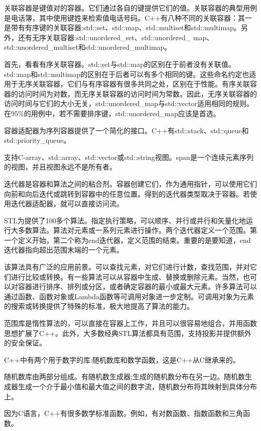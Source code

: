 关联容器是键值对的容器。它们通过各自的键提供它们的值。关联容器的典型用例是电话簿，其中使用键姓来检索值电话号码。C++有八种不同的关联容器：其一是带有有序键的关联容器:std::set、std::map、std::multiset和std::multimap。另外，还有无序关联容器:std::unordered\_set、std::unordered\_ map、std::unordered\_multiset和std::unordered\_multimap。

首先，看看有序关联容器。std::set与std::map的区别在于前者没有关联值。std::map和std::multimap的区别在于后者可以有多个相同的键。这些命名约定也适用于无序关联容器，它们与有序容器有很多共同之处，区别在于性能。有序关联容器的访问时间为对数，而无序关联容器的访问时间为常数。因此，无序关联容器的访问时间与它们的大小无关，std::unordered\_map与std::vector适用相同的规则。在95\%的用例中，若不需要排序键，std::unordered\_map应该是首选。

容器适配器为序列容器提供了一个简化的接口。C++有std::stack、std::queue和std::priority\_queue。

支持C-array、std::array、std::vector或std::string视图。span是一个连续元素序列的视图，并且视图永远不是所有者。

迭代器是容器和算法之间的粘合剂。容器创建它们，作为通用指针，可以使用它们向前和向后迭代或跳转到容器中的任意位置。得到的迭代器类型取决于容器。若使用迭代器适配器，就可以直接访问流。

STL为提供了100多个算法。指定执行策略，可以顺序、并行或并行和矢量化地运行大多数算法。算法对元素或一系列元素进行操作。两个迭代器定义一个范围。第一个定义开始，第二个称为end迭代器，定义范围的结束。重要的是要知道，end迭代器指向超出范围末端的一个元素。

该算法具有广泛的应用前景。可以查找元素，对它们进行计数，查找范围，并对它们进行比较或转换。有一些算法可以从容器中生成、替换或删除元素。当然，也可以对容器进行排序、排列或分区，或者确定容器的最小或最大元素。许多算法可以通过函数、函数对象或Lambda函数等可调用对象进一步定制。可调用对象为元素的搜索或转换提供了特殊的标准，极大地提高了算法的能力。

范围库是惰性算法的，可以直接在容器上工作，并且可以很容易地组合，并用函数思想扩展了C++。此外，大多数经典STL算法都具有范围，支持投影并提供额外的安全保证。


C++中有两个用于数字的库:随机数库和数学函数，这是C++从C继承来的。

随机数库由两部分组成。有随机数生成器;生成的随机数分布在另一边。随机数生成器生成一个介于最小值和最大值之间的数字流，随机数分布将其映射到具体分布上。

因为C语言，C++有很多数学标准函数。例如，有对数函数、指数函数和三角函数。

